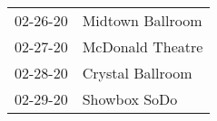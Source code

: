 \begin{supertabular}{p{0.25\columnwidth}p{0.75\columnwidth}}
 02-26-20 &  Midtown Ballroom \\
 02-27-20 &  McDonald Theatre \\
 02-28-20 &  Crystal Ballroom \\
 02-29-20 &      Showbox SoDo \\
\end{supertabular}
